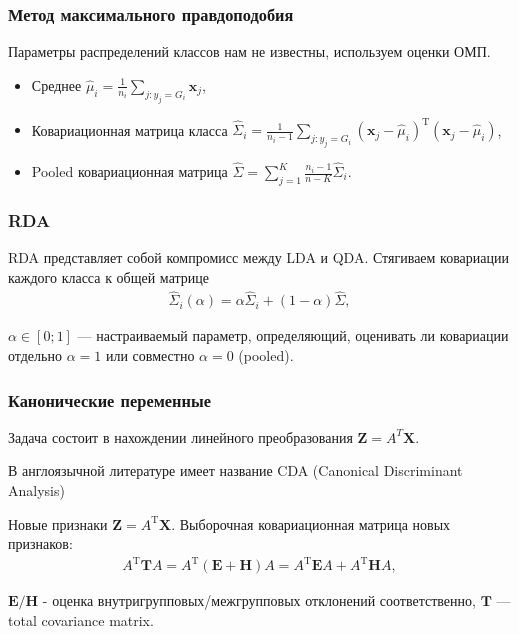 \documentclass[11pt]{beamer}
\begin{document}
	\begin{frame}
	\frametitle{Метод максимального правдоподобия}
	
	Параметры распределений классов нам не известны, используем оценки ОМП.
	\begin{itemize}
		\item Среднее
		$\widehat{\mu}_i = \frac{1}{n_i}\sum\limits_{j: y_j = G_i} \mathbf{x}_j$,
		\item Ковариационная матрица класса $\hat \Sigma_i = \frac{1}{n_i - 1}\sum\limits_{j: y_j = G_i} (\mathbf{x}_j - \widehat{\mu}_i)^\mathrm{T}(\mathbf{x}_j - \widehat{\mu}_i)$,
		\item Pooled ковариационная матрица $\hat \Sigma= \sum\limits_{j = 1}^K\frac{n_i - 1}{n - K} \hat \Sigma_i$.
	\end{itemize}
	
	\end{frame}

	\begin{frame}
	\frametitle{RDA}
	
	RDA представляет собой компромисс между LDA и QDA. Стягиваем ковариации каждого класса к общей матрице
	\begin{align*}
		\hat{\Sigma}_i(\alpha) = \alpha \widehat{\Sigma}_i + (1 - \alpha)\hat{\Sigma},
	\end{align*}
	
	$\alpha \in [0; 1]$ --- настраиваемый параметр, определяющий, оценивать ли ковариации отдельно $\alpha = 1$ или совместно $\alpha = 0$ (pooled).
	
	\end{frame}

	\begin{frame}
	\frametitle{Канонические переменные}
	
	Задача состоит в нахождении линейного преобразования $\mathbf{Z} = A^T \mathbf{X}$. 
	
	В англоязычной литературе имеет название CDA (Canonical Discriminant Analysis)
	
	Новые признаки $\textbf{Z}=A^{\mathrm{T}}\textbf{X}$. Выборочная ковариационная матрица новых признаков:
	\begin{eqnarray}\label{CDA_3}
		A^{\mathrm{T}}\textbf{T}A=A^{\mathrm{T}}(\textbf{E}+\textbf{H})A=A^{\mathrm{T}}\textbf{E}A+A^{\mathrm{T}}\textbf{H}A,
	\end{eqnarray}

	$\textbf{E}/\textbf{H}$ - оценка внутригрупповых/межгрупповых отклонений соответственно, $\textbf{T}$ --- total covariance matrix.
	

	\end{frame}
\end{document}
